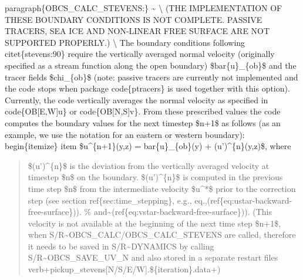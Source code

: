 \documentclass[letterpaper,10pt,english]{sphinxmanual}
\begin{document}
paragraph\{OBCS\_CALC\_STEVENS:\} \textasciitilde{} \textbackslash{}
(THE IMPLEMENTATION OF THESE BOUNDARY CONDITIONS IS NOT
COMPLETE. PASSIVE TRACERS, SEA ICE AND NON-LINEAR FREE SURFACE ARE NOT
SUPPORTED PROPERLY.) \textbackslash{}
The boundary conditions following citet\{stevens:90\} require the
vertically averaged normal velocity (originally specified as a stream
function along the open boundary) \$bar\{u\}\_\{ob\}\$ and the tracer fields
\$chi\_\{ob\}\$ (note: passive tracers are currently not implemented and
the code stops when package code\{ptracers\} is used together with this
option). Currently, the code vertically averages the normal velocity
as specified in code\{OB{[}E,W{]}u\} or code\{OB{[}N,S{]}v\}. From these
prescribed values the code computes the boundary values for the next
timestep \$n+1\$ as follows (as an example, we use the notation for an
eastern or western boundary):
begin\{itemize\}
item \$u\textasciicircum{}\{n+1\}(y,z) = bar\{u\}\_\{ob\}(y) + (u')\textasciicircum{}\{n\}(y,z)\$, where
\begin{quote}

\$(u')\textasciicircum{}\{n\}\$ is the deviation from the vertically averaged velocity at
timestep \$n\$ on the boundary. \$(u')\textasciicircum{}\{n\}\$ is computed in the previous
time step \$n\$ from the intermediate velocity \$u\textasciicircum{}*\$ prior to the
correction step (see section ref\{sec:time\_stepping\}, e.g.,
eq.,(ref\{eq:ustar-backward-free-surface\})).
\% and\textasciitilde{}(ref\{eq:vstar-backward-free-surface\})).
(This velocity is not
available at the beginning of the next time step \$n+1\$, when
S/R\textasciitilde{}OBCS\_CALC/OBCS\_CALC\_STEVENS are called, therefore it needs to
be saved in S/R\textasciitilde{}DYNAMICS by calling S/R\textasciitilde{}OBCS\_SAVE\_UV\_N and also
stored in a separate restart files
verb+pickup\_stevens{[}N/S/E/W{]}.\$\{iteration\}.data+)
\end{quote}
\end{document}
